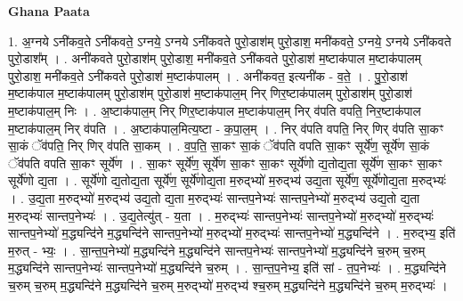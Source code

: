 \documentclass[17pt]{extarticle}
\begin{document}
\textbf{Ghana Paata } \newline

1. अ॒ग्नये ऽनी॑कव॒ते ऽनी॑कवते॒ ऽग्नये॒ ऽग्नये ऽनी॑कवते पुरो॒डाश॑म् पुरो॒डाश॒ मनी॑कवते॒ ऽग्नये॒ ऽग्नये ऽनी॑कवते पुरो॒डाश᳚म् । . अनी॑कवते पुरो॒डाश॑म् पुरो॒डाश॒ मनी॑कव॒ते ऽनी॑कवते पुरो॒डाश॑ म॒ष्टाक॑पाल म॒ष्टाक॑पालम् पुरो॒डाश॒ मनी॑कव॒ते ऽनी॑कवते पुरो॒डाश॑ म॒ष्टाक॑पालम् । . अनी॑कवत॒ इत्यनी॑क - व॒ते॒ । . पु॒रो॒डाश॑ म॒ष्टाक॑पाल म॒ष्टाक॑पालम् पुरो॒डाश॑म् पुरो॒डाश॑ म॒ष्टाक॑पाल॒म् निर् णिर॒ष्टाक॑पालम् पुरो॒डाश॑म् पुरो॒डाश॑ म॒ष्टाक॑पाल॒म् निः । . अ॒ष्टाक॑पाल॒म् निर् णिर॒ष्टाक॑पाल म॒ष्टाक॑पाल॒म् निर् व॑पति वपति॒ निर॒ष्टाक॑पाल म॒ष्टाक॑पाल॒म् निर् व॑पति । . अ॒ष्टाक॑पाल॒मित्य॒ष्टा - क॒पा॒ल॒म् । . निर् व॑पति वपति॒ निर् णिर् व॑पति सा॒कꣳ सा॒कं ॅव॑पति॒ निर् णिर् व॑पति सा॒कम् । . व॒प॒ति॒ सा॒कꣳ सा॒कं ॅव॑पति वपति सा॒कꣳ सूर्ये॑ण॒ सूर्ये॑ण सा॒कं ॅव॑पति वपति सा॒कꣳ सूर्ये॑ण । . सा॒कꣳ सूर्ये॑ण॒ सूर्ये॑ण सा॒कꣳ सा॒कꣳ सूर्ये॑णो द्य॒तोद्य॒ता सूर्ये॑ण सा॒कꣳ सा॒कꣳ सूर्ये॑णो द्य॒ता । . सूर्ये॑णो द्य॒तोद्य॒ता सूर्ये॑ण॒ सूर्ये॑णोद्य॒ता म॒रुद्भ्यो॑ म॒रुद्भ्य॑ उद्य॒ता सूर्ये॑ण॒ सूर्ये॑णोद्य॒ता म॒रुद्भ्यः॑ । . उ॒द्य॒ता म॒रुद्भ्यो॑ म॒रुद्भ्य॑ उद्य॒तो द्य॒ता म॒रुद्भ्यः॑ सान्तप॒नेभ्यः॑ सान्तप॒नेभ्यो॑ म॒रुद्भ्य॑ उद्य॒तो द्य॒ता म॒रुद्भ्यः॑ सान्तप॒नेभ्यः॑ । . उ॒द्य॒तेत्यु॑त् - य॒ता । . म॒रुद्भ्यः॑ सान्तप॒नेभ्यः॑ सान्तप॒नेभ्यो॑ म॒रुद्भ्यो॑ म॒रुद्भ्यः॑ सान्तप॒नेभ्यो॑ म॒द्ध्यन्दि॑ने म॒द्ध्यन्दि॑ने सान्तप॒नेभ्यो॑ म॒रुद्भ्यो॑ म॒रुद्भ्यः॑ सान्तप॒नेभ्यो॑ म॒द्ध्यन्दि॑ने । . म॒रुद्भ्य॒ इति॑ म॒रुत् - भ्यः॒ । . सा॒न्त॒प॒नेभ्यो॑ म॒द्ध्यन्दि॑ने म॒द्ध्यन्दि॑ने सान्तप॒नेभ्यः॑ सान्तप॒नेभ्यो॑ म॒द्ध्यन्दि॑ने च॒रुम् च॒रुम् म॒द्ध्यन्दि॑ने सान्तप॒नेभ्यः॑ सान्तप॒नेभ्यो॑ म॒द्ध्यन्दि॑ने च॒रुम् । . सा॒न्त॒प॒नेभ्य॒ इति॑ सां - त॒प॒नेभ्यः॑ । . म॒द्ध्यन्दि॑ने च॒रुम् च॒रुम् म॒द्ध्यन्दि॑ने म॒द्ध्यन्दि॑ने च॒रुम् म॒रुद्भ्यो॑ म॒रुद्भ्य॑ श्च॒रुम् म॒द्ध्यन्दि॑ने म॒द्ध्यन्दि॑ने च॒रुम् म॒रुद्भ्यः॑ । \newline
\end{document}

